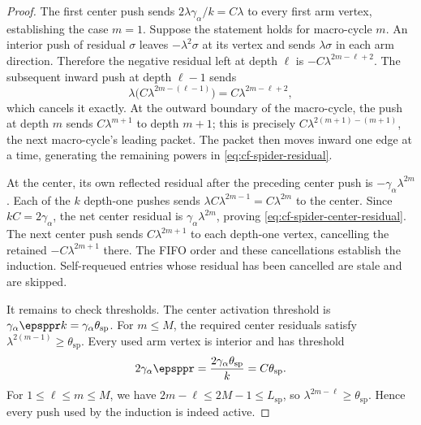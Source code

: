 \begin{proof}
The first center push sends
\(2\lambda\gamma_\alpha/k=C\lambda\) to every first arm vertex, establishing
the case \(m=1\).  Suppose the statement holds for macro-cycle \(m\).  An
interior push of residual \(\sigma\) leaves \(-\lambda^2\sigma\) at its vertex
and sends \(\lambda \sigma\) in each arm direction. Therefore the negative
residual left at depth \(\ell\) is
\(-C\lambda^{2m-\ell+2}\).  The subsequent inward push at depth
\(\ell-1\) sends
\begin{equation}
    \lambda\bigl(C\lambda^{2m-(\ell-1)}\bigr)
    =C\lambda^{2m-\ell+2},
    \label{eq:cf-spider-cancellation}
\end{equation}
which cancels it exactly.  At the outward boundary of the macro-cycle, the
push at depth \(m\) sends
\(C\lambda^{m+1}\) to depth \(m+1\); this is precisely
\(C\lambda^{2(m+1)-(m+1)}\), the next macro-cycle's leading packet.  The
packet then moves inward one edge at a time, generating the remaining powers
in \cref{eq:cf-spider-residual}.

At the center, its own reflected residual after the preceding center push is
\(-\gamma_\alpha\lambda^{2m}\).  Each of the \(k\) depth-one pushes sends
\(\lambda C\lambda^{2m-1}=C\lambda^{2m}\) to the center.  Since
\(kC=2\gamma_\alpha\), the net center residual is
\(\gamma_\alpha\lambda^{2m}\), proving
\cref{eq:cf-spider-center-residual}.  The next center push sends
\(C\lambda^{2m+1}\) to each depth-one vertex, cancelling the retained
\(-C\lambda^{2m+1}\) there.  The FIFO order and these cancellations establish
the induction.  Self-requeued entries whose residual has been cancelled are
stale and are skipped.

It remains to check thresholds.  The center activation threshold is
\(\gamma_\alpha\epsppr k=\gamma_\alpha \theta_{\mathrm{sp}}\).  For \(m\leq M\), the required
center residuals satisfy \(\lambda^{2(m-1)}\geq \theta_{\mathrm{sp}}\).  Every used arm vertex is
interior and has threshold
\begin{equation}
    2\gamma_\alpha\epsppr
    =\frac{2\gamma_\alpha \theta_{\mathrm{sp}}}{k}
    =C\theta_{\mathrm{sp}}.
    \label{eq:cf-spider-arm-threshold}
\end{equation}
For \(1\leq\ell\leq m\leq M\), we have
\(2m-\ell\leq2M-1\leq L_{\mathrm{sp}}\), so
\(\lambda^{2m-\ell}\geq \theta_{\mathrm{sp}}\).  Hence every push used by the induction is
indeed active.
\end{proof}

